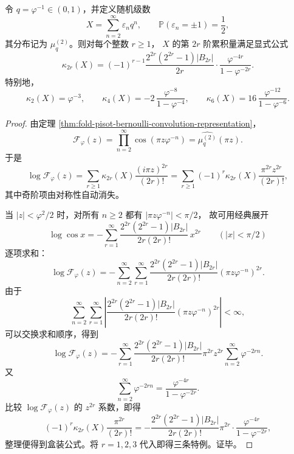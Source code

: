 \begin{theorem}\label{thm:xi-pisot-bernoulli-even-cumulants-closed}
令 \(q=\varphi^{-1}\in(0,1)\)，并定义随机级数
\[
X=\sum_{n=2}^{\infty}\varepsilon_n q^n,
\qquad
\mathbb P(\varepsilon_n=\pm 1)=\frac12,
\]
其分布记为 \(\mu_q^{(2)}\)。则对每个整数 \(r\ge 1\)，
\(X\) 的第 \(2r\) 阶累积量满足显式公式
\[
\boxed{\;
\kappa_{2r}(X)
=
(-1)^{r-1}
\frac{2^{2r}(2^{2r}-1)|B_{2r}|}{2r}
\cdot
\frac{\varphi^{-4r}}{1-\varphi^{-2r}}.\;}
\]
特别地，
\[
\kappa_2(X)=\varphi^{-3},
\qquad
\kappa_4(X)=-2\,\frac{\varphi^{-8}}{1-\varphi^{-4}},
\qquad
\kappa_6(X)=16\,\frac{\varphi^{-12}}{1-\varphi^{-6}}.
\]
\end{theorem}
\begin{proof}
由定理 \ref{thm:fold-pisot-bernoulli-convolution-representation}，
\[
\mathcal F_\varphi(z)
=
\prod_{n=2}^{\infty}\cos(\pi z\varphi^{-n})
=
\widehat{\mu_q^{(2)}}(\pi z).
\]
于是
\[
\log \mathcal F_\varphi(z)
=
\sum_{r\ge 1}\kappa_{2r}(X)\frac{(i\pi z)^{2r}}{(2r)!}
=
\sum_{r\ge 1}(-1)^r\kappa_{2r}(X)\frac{\pi^{2r}z^{2r}}{(2r)!},
\]
其中奇阶项由对称性自动消失。

当 \(|z|<\varphi^2/2\) 时，对所有 \(n\ge 2\) 都有
\(
|\pi z\varphi^{-n}|<\pi/2
\)，
故可用经典展开
\[
\log\cos x
=
-\sum_{r=1}^{\infty}
\frac{2^{2r}(2^{2r}-1)|B_{2r}|}{2r(2r)!}\,x^{2r}
\qquad (|x|<\pi/2)
\]
逐项求和：
\[
\log \mathcal F_\varphi(z)
=
-\sum_{n=2}^{\infty}\sum_{r=1}^{\infty}
\frac{2^{2r}(2^{2r}-1)|B_{2r}|}{2r(2r)!}
(\pi z\varphi^{-n})^{2r}.
\]
由于
\[
\sum_{n=2}^{\infty}\sum_{r=1}^{\infty}
\left|
\frac{2^{2r}(2^{2r}-1)|B_{2r}|}{2r(2r)!}
(\pi z\varphi^{-n})^{2r}
\right|
<\infty,
\]
可以交换求和顺序，得到
\[
\log \mathcal F_\varphi(z)
=
-\sum_{r=1}^{\infty}
\frac{2^{2r}(2^{2r}-1)|B_{2r}|}{2r(2r)!}
\pi^{2r}z^{2r}
\sum_{n=2}^{\infty}\varphi^{-2rn}.
\]
又
\[
\sum_{n=2}^{\infty}\varphi^{-2rn}
=
\frac{\varphi^{-4r}}{1-\varphi^{-2r}}.
\]
比较 \(\log \mathcal F_\varphi(z)\) 的 \(z^{2r}\) 系数，即得
\[
(-1)^r\kappa_{2r}(X)\frac{\pi^{2r}}{(2r)!}
=
-
\frac{2^{2r}(2^{2r}-1)|B_{2r}|}{2r(2r)!}
\pi^{2r}
\cdot
\frac{\varphi^{-4r}}{1-\varphi^{-2r}},
\]
整理便得到盒装公式。将 \(r=1,2,3\) 代入即得三条特例。证毕。
\end{proof}

